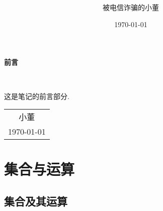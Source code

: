 \documentclass[11pt, a4paper, twoside]{ctexbook}
\title{{\Huge{\heiti{实分析习题选解}}}\\\mathbf{Notes and Exercises}}
\author{被电信诈骗的小董}
\date{\today}
\begin{document}
	
	\maketitle
	
	\setcounter{page}{1}
	
	\begin{center}
		\huge\textbf{前言}
	\end{center}~\
	
	这是笔记的前言部分. 
	~\\
	\begin{flushright}
		\begin{tabular}{c}
			小董\\
			\today
		\end{tabular}
	\end{flushright}
	
	\newpage
	\setcounter{page}{1}
	\tableofcontents
	\newpage
	\setcounter{page}{1}
	
	\chapter{集合与运算}
	
	
	
	\section{集合及其运算 }
	
\end{document}
